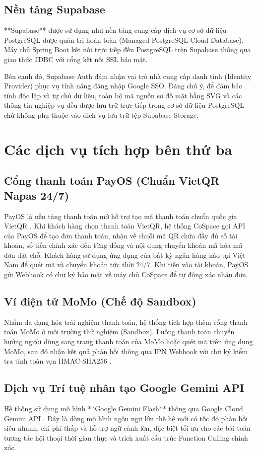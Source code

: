 \subsection{Nền tảng Supabase}
**Supabase** được sử dụng như nền tảng cung cấp dịch vụ cơ sở dữ liệu PostgreSQL được quản trị hoàn toàn (Managed PostgreSQL Cloud Database). Máy chủ Spring Boot kết nối trực tiếp đến PostgreSQL trên Supabase thông qua giao thức JDBC với cổng kết nối SSL bảo mật. 

Bên cạnh đó, Supabase Auth đảm nhận vai trò nhà cung cấp danh tính (Identity Provider) phục vụ tính năng đăng nhập Google SSO. Đáng chú ý, để đảm bảo tính độc lập và tự chủ dữ liệu, toàn bộ mã nguồn sơ đồ mặt bằng SVG và các thông tin nghiệp vụ đều được lưu trữ trực tiếp trong cơ sở dữ liệu PostgreSQL chứ không phụ thuộc vào dịch vụ lưu trữ tệp Supabase Storage.

\section{Các dịch vụ tích hợp bên thứ ba}
\label{sec:cn_tichhop}

\subsection{Cổng thanh toán PayOS (Chuẩn VietQR Napas 24/7)}
PayOS là nền tảng thanh toán mở hỗ trợ tạo mã thanh toán chuẩn quốc gia VietQR \cite{payos_docs}. Khi khách hàng chọn thanh toán VietQR, hệ thống CoSpace gọi API của PayOS để tạo đơn thanh toán, nhận về chuỗi mã QR chứa đầy đủ số tài khoản, số tiền chính xác đến từng đồng và nội dung chuyển khoản mã hóa mã đơn đặt chỗ. Khách hàng sử dụng ứng dụng của bất kỳ ngân hàng nào tại Việt Nam để quét mã và chuyển khoản tức thời 24/7. Khi tiền vào tài khoản, PayOS gửi Webhook có chữ ký bảo mật về máy chủ CoSpace để tự động xác nhận đơn.

\subsection{Ví điện tử MoMo (Chế độ Sandbox)}
Nhằm đa dạng hóa trải nghiệm thanh toán, hệ thống tích hợp thêm cổng thanh toán MoMo ở môi trường thử nghiệm (Sandbox). Luồng thanh toán chuyển hướng người dùng sang trang thanh toán của MoMo hoặc quét mã trên ứng dụng MoMo, sau đó nhận kết quả phản hồi thông qua IPN Webhook với chữ ký kiểm tra tính toàn vẹn HMAC-SHA256 \cite{momo_docs}.

\subsection{Dịch vụ Trí tuệ nhân tạo Google Gemini API}
Hệ thống sử dụng mô hình **Google Gemini Flash** thông qua Google Cloud Gemini API \cite{gemini_function_calling}. Đây là dòng mô hình ngôn ngữ lớn thế hệ mới có tốc độ phản hồi siêu nhanh, chi phí thấp và hỗ trợ ngữ cảnh lớn, đặc biệt tối ưu cho các bài toán tương tác hội thoại thời gian thực và trích xuất cấu trúc Function Calling chính xác.


